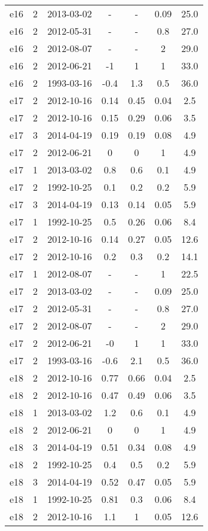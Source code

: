 \begin{table*}[htp]
\begin{tabular}{ccccccc}
e16 & 2 & 2013-03-02 & - & - & 0.09 & 25.0 \\
e16 & 2 & 2012-05-31 & - & - & 0.8 & 27.0 \\
e16 & 2 & 2012-08-07 & - & - & 2 & 29.0 \\
e16 & 2 & 2012-06-21 & -1 & 1 & 1 & 33.0 \\
e16 & 2 & 1993-03-16 & -0.4 & 1.3 & 0.5 & 36.0 \\
e17 & 2 & 2012-10-16 & 0.14 & 0.45 & 0.04 & 2.5 \\
e17 & 2 & 2012-10-16 & 0.15 & 0.29 & 0.06 & 3.5 \\
e17 & 3 & 2014-04-19 & 0.19 & 0.19 & 0.08 & 4.9 \\
e17 & 2 & 2012-06-21 & 0 & 0 & 1 & 4.9 \\
e17 & 1 & 2013-03-02 & 0.8 & 0.6 & 0.1 & 4.9 \\
e17 & 2 & 1992-10-25 & 0.1 & 0.2 & 0.2 & 5.9 \\
e17 & 3 & 2014-04-19 & 0.13 & 0.14 & 0.05 & 5.9 \\
e17 & 1 & 1992-10-25 & 0.5 & 0.26 & 0.06 & 8.4 \\
e17 & 2 & 2012-10-16 & 0.14 & 0.27 & 0.05 & 12.6 \\
e17 & 2 & 2012-10-16 & 0.2 & 0.3 & 0.2 & 14.1 \\
e17 & 1 & 2012-08-07 & - & - & 1 & 22.5 \\
e17 & 2 & 2013-03-02 & - & - & 0.09 & 25.0 \\
e17 & 2 & 2012-05-31 & - & - & 0.8 & 27.0 \\
e17 & 2 & 2012-08-07 & - & - & 2 & 29.0 \\
e17 & 2 & 2012-06-21 & -0 & 1 & 1 & 33.0 \\
e17 & 2 & 1993-03-16 & -0.6 & 2.1 & 0.5 & 36.0 \\
e18 & 2 & 2012-10-16 & 0.77 & 0.66 & 0.04 & 2.5 \\
e18 & 2 & 2012-10-16 & 0.47 & 0.49 & 0.06 & 3.5 \\
e18 & 1 & 2013-03-02 & 1.2 & 0.6 & 0.1 & 4.9 \\
e18 & 2 & 2012-06-21 & 0 & 0 & 1 & 4.9 \\
e18 & 3 & 2014-04-19 & 0.51 & 0.34 & 0.08 & 4.9 \\
e18 & 2 & 1992-10-25 & 0.4 & 0.5 & 0.2 & 5.9 \\
e18 & 3 & 2014-04-19 & 0.52 & 0.47 & 0.05 & 5.9 \\
e18 & 1 & 1992-10-25 & 0.81 & 0.3 & 0.06 & 8.4 \\
e18 & 2 & 2012-10-16 & 1.1 & 1 & 0.05 & 12.6 \\

\end{tabular}
\end{table*}
